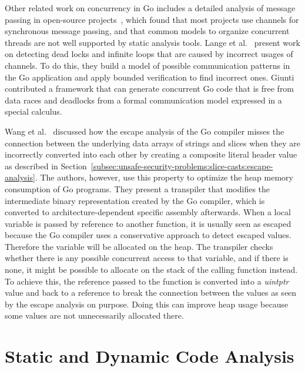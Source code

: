Other related work on concurrency in Go includes a detailed analysis of message passing in open-source
projects~\cite{dilley2019}, which found that most projects use channels for synchronous message passing, and that common
models to organize concurrent threads are not well supported by static analysis tools.
Lange et al.~\cite{lange2017} present work on detecting dead locks and infinite loops that are caused by incorrect
usages of channels.
To do this, they build a model of possible communication patterns in the Go application and apply bounded verification
to find incorrect ones.
Giunti~\cite{giunti2020} contributed a framework that can generate concurrent Go code that is free from data races and
deadlocks from a formal communication model expressed in a special calculus.

Wang et al.~\cite{wang2020} discussed how the escape analysis of the Go compiler misses the connection between the
underlying data arrays of strings and slices when they are incorrectly converted into each other by creating a composite
literal header value as described in Section~\ref{subsec:unsafe-security-problems:slice-casts:escape-analysis}.
The authors, however, use this property to optimize the heap memory consumption of Go programs.
They present a transpiler that modifies the intermediate binary representation created by the Go compiler, which is
converted to architecture-dependent specific assembly afterwards.
When a local variable is passed by reference to another function, it is usually seen as escaped because the Go compiler
uses a conservative approach to detect escaped values.
Therefore the variable will be allocated on the heap.
The transpiler checks whether there is any possible concurrent access to that variable, and if there is none, it might
be possible to allocate on the stack of the calling function instead.
To achieve this, the reference passed to the function is converted into a \textit{uintptr} value and back to a reference
to break the connection between the values as seen by the escape analysis on purpose.
Doing this can improve heap usage because some values are not unnecessarily allocated there.



\section{Static and Dynamic Code Analysis}\label{sec:related-work:static-code-analysis}

